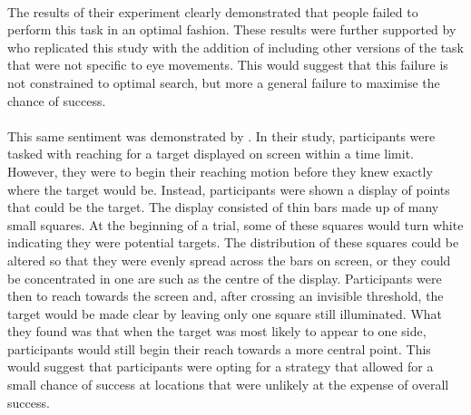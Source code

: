 \documentclass[12pt]{article}
\begin{document}
\paragraph{} The results of their experiment clearly demonstrated that people failed to perform this task in an optimal fashion. These results were further supported by \cite{clarke2015failure} who replicated this study with the addition of including other versions of the task that were not specific to eye movements. This would suggest that this failure is not constrained to optimal search, but more a general failure to maximise the chance of success. 

\paragraph{} This same sentiment was demonstrated by \cite{Hudson2007probmove}. In their study, participants were tasked with reaching for a target displayed on screen within a time limit. However, they were to begin their reaching motion before they knew exactly where the target would be. Instead, participants were shown a display of points that could be the target. The display consisted of thin bars made up of many small squares. At the beginning of a trial, some of these squares would turn white indicating they were potential targets. The distribution of these squares could be altered so that they were evenly spread across the bars on screen, or they could be concentrated in one are such as the centre of the display. Participants were then to reach towards the screen and, after crossing an invisible threshold, the target would be made clear by leaving only one square still illuminated. What they found was that when the target was most likely to appear to one side, participants would still begin their reach towards a more central point. This would suggest that participants were opting for a strategy that allowed for a small chance of success at locations that were unlikely at the expense of overall success. 
\end{document}
